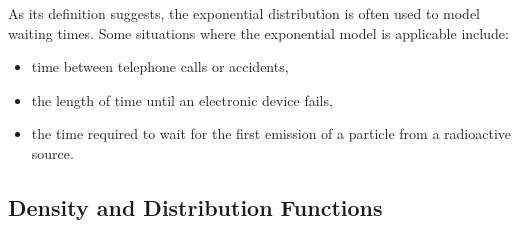 As its definition suggests, the exponential distribution is often used to model waiting times. Some situations where the exponential model is applicable include:
\begin{itemize}
    \item time between telephone calls or accidents,
    \item the length of time until an electronic device fails,
    \item the time required to wait for the first emission of a particle from a radioactive source.
\end{itemize}

\subsection{Density and Distribution Functions}

